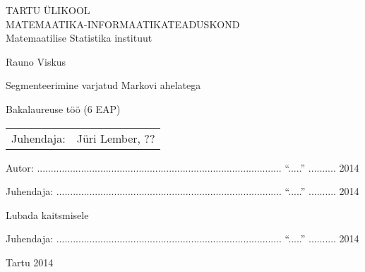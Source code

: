\thispagestyle{empty}
\begin{center}

\large
TARTU ÜLIKOOL\\[2mm]
\uppercase{Matemaatika-Informaatikateaduskond}\\[2mm]
Matemaatilise Statistika instituut\\

\vspace{25mm}

\Large Rauno Viskus

\vspace{4mm}

\huge Segmenteerimine varjatud Markovi ahelatega

\vspace{20mm}

\Large Bakalaureuse töö (6 EAP)

\end{center}

\vspace{2mm}

\begin{flushright}
 {
 \setlength{\extrarowheight}{5pt}
 \begin{tabular}{r l} 
  \sffamily Juhendaja: & \sffamily Jüri Lember, ?? \\
 \end{tabular}
 }
\end{flushright}

\vspace{10mm}

{\noindent Autor: ......................................................................................... ``.....'' ..........\hskip16pt 2014}
\vspace{2mm}

{\noindent Juhendaja: .................................................................................. ``.....'' ..........\hskip16pt 2014}

\vspace{8mm}

{\noindent Lubada kaitsmisele}

{\noindent Juhendaja: .................................................................................. ``.....'' ..........\hskip16pt 2014}

\vfill
\centerline{Tartu 2014}
